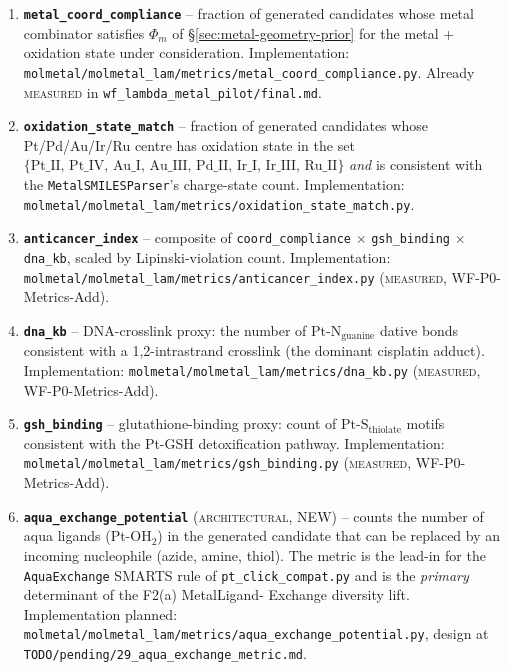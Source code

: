 \begin{enumerate}
  \item \textbf{\texttt{metal\_coord\_compliance}} --
        fraction of generated candidates whose metal
        combinator satisfies
        $\Phi_{m}$ of \S\ref{sec:metal-geometry-prior}
        for the metal + oxidation state under
        consideration. Implementation:
        \texttt{molmetal/molmetal\_lam/metrics/metal\_coord\_compliance.py}.
        Already \textsc{measured} in
        \texttt{wf\_lambda\_metal\_pilot/final.md}.

  \item \textbf{\texttt{oxidation\_state\_match}} --
        fraction of generated candidates whose Pt/Pd/Au/Ir/Ru
        centre has oxidation state in the set
        $\{\text{Pt\_II},\,\text{Pt\_IV},\,\text{Au\_I},\,
        \text{Au\_III},\,\text{Pd\_II},\,\text{Ir\_I},\,
        \text{Ir\_III},\,\text{Ru\_II}\}$ \emph{and} is
        consistent with the \texttt{MetalSMILESParser}'s
        charge-state count. Implementation:
        \texttt{molmetal/molmetal\_lam/metrics/oxidation\_state\_match.py}.

  \item \textbf{\texttt{anticancer\_index}} -- composite of
        {\tt coord\_compliance} $\times$ {\tt gsh\_binding}
        $\times$ {\tt dna\_kb}, scaled by
        Lipinski-violation count. Implementation:
        \texttt{molmetal/molmetal\_lam/metrics/anticancer\_index.py}
        (\textsc{measured}, WF-P0-Metrics-Add).

  \item \textbf{\texttt{dna\_kb}} -- DNA-crosslink proxy: the
        number of $\text{Pt-N}_\text{guanine}$ dative bonds
        consistent with a 1,2-intrastrand crosslink
        (the dominant cisplatin adduct). Implementation:
        \texttt{molmetal/molmetal\_lam/metrics/dna\_kb.py}
        (\textsc{measured}, WF-P0-Metrics-Add).

  \item \textbf{\texttt{gsh\_binding}} -- glutathione-binding
        proxy: count of $\text{Pt-S}_\text{thiolate}$ motifs
        consistent with the Pt-GSH detoxification pathway.
        Implementation:
        \texttt{molmetal/molmetal\_lam/metrics/gsh\_binding.py}
        (\textsc{measured}, WF-P0-Metrics-Add).

  \item \textbf{\texttt{aqua\_exchange\_potential}}
        (\textsc{architectural}, NEW) -- counts the number of
        aqua ligands ($\text{Pt-OH}_2$) in the generated
        candidate that can be replaced by an incoming
        nucleophile (azide, amine, thiol). The metric is the
        lead-in for the \texttt{AquaExchange} SMARTS rule of
        \texttt{pt\_click\_compat.py} and is the
        \emph{primary} determinant of the F2(a) MetalLigand-
        Exchange diversity lift. Implementation planned:
        \texttt{molmetal/molmetal\_lam/metrics/aqua\_exchange\_potential.py},
        design at \texttt{TODO/pending/29\_aqua\_exchange\_metric.md}.


\end{enumerate}
